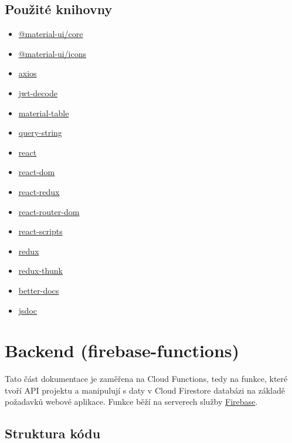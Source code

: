 \documentclass[a4paper,12pt]{article}
\begin{document}
\subsection{Použité knihovny}
\begin{itemize}
\item
  \href{https://www.npmjs.com/package/@material-ui/core}{@material-ui/core}
\item
  \href{https://www.npmjs.com/package/@material-ui/icons}{@material-ui/icons}
\item
  \href{https://www.npmjs.com/package/axios}{axios}
\item
  \href{https://www.npmjs.com/package/jwt-decode}{jwt-decode}
\item
  \href{https://www.npmjs.com/package/material-table}{material-table}
\item
  \href{https://www.npmjs.com/package/query-string}{query-string}
\item
  \href{https://www.npmjs.com/package/react}{react}
\item
  \href{https://www.npmjs.com/package/react-dom}{react-dom}
\item
  \href{https://www.npmjs.com/package/react-redux}{react-redux}
\item
  \href{https://www.npmjs.com/package/react-router-dom}{react-router-dom}
\item
  \href{https://www.npmjs.com/package/react-scripts}{react-scripts}
\item
  \href{https://www.npmjs.com/package/redux}{redux}
\item
 \href{https://www.npmjs.com/package/redux-thunk}{redux-thunk}
\item
  \href{https://www.npmjs.com/package/better-docs}{better-docs}
\item
 \href{https://www.npmjs.com/package/jsdoc}{jsdoc}
\end{itemize}

\section{Backend (firebase-functions)}
Tato část dokumentace je zaměřena na Cloud Functions, tedy na funkce, které tvoří API projektu a manipulují s daty v Cloud Firestore databázi na základě požadavků webové aplikace. Funkce běží na serverech služby \href{https://firebase.google.com/}{Firebase}.

\subsection{Struktura kódu}
\end{document}
